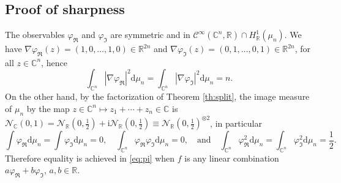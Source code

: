 \documentclass[11pt,reqno]{amsart}
\numberwithin{equation}{section}%
\numberwithin{figure}{section}%
\numberwithin{table}{section}
\theoremstyle{plain}
\theoremstyle{definition}
\begin{document}
\subsection{Proof of sharpness}
\label{ss:proof:sharp}

The observables $\varphi_\Re$ and $\varphi_\Im$ are symmetric and in
$\mathcal{C}^\infty(\mathbb{C}^n,\mathbb{R})\cap H^1_{\mathbb{R}}(\mu_n)$. We
have $\nabla\varphi_\Re(z)=(1,0,\ldots,1,0)\in\mathbb{R}^{2n}$ and
$\nabla\varphi_\Im(z)=(0,1,\ldots,0,1)\in\mathbb{R}^{2n}$, for all
$z\in\mathbb{C}^n$, hence
\begin{equation}
  \int_{\mathbb{C}^n}|\nabla\varphi_\Re|^2\mathrm{d}\mu_n
  =\int_{\mathbb{C}^n}|\nabla\varphi_\Im|^2\mathrm{d}\mu_n
  =n.
\end{equation}
On the other hand, by the factorization of Theorem \ref{th:split}, the image
measure of $\mu_n$ by the map
$z\in\mathbb{C}^n\mapsto z_1+\cdots+z_n\in\mathbb{C}$ is
$\mathcal{N}_{\mathbb{C}}(0,1)=\mathcal{N}_{\mathbb{R}}(0,\frac{1}{2})+\mathrm{i}\mathcal{N}_{\mathbb{R}}(0,\frac{1}{2})\equiv\mathcal{N}_{\mathbb{R}}(0,\frac{1}{2})^{\otimes
  2}$, in particular
\begin{equation}
  \int\varphi_\Re\mathrm{d}\mu_n
  =\int\varphi_\Im\mathrm{d}\mu_n=0,\quad
  \int_{\mathbb{C}^n}\varphi_\Re\varphi_\Im\mathrm{d}\mu_n
  =0,
  \quad\text{and}\quad 
  \int_{\mathbb{C}^n}\varphi_\Re^2\mathrm{d}\mu_n
  = \int_{\mathbb{C}^n}\varphi_\Im^2\mathrm{d}\mu_n
  =\frac{1}{2}.
\end{equation}
Therefore equality is achieved in \eqref{eq:pi} when $f$ is any linear
combination $a\varphi_\Re+b\varphi_\Im$, $a,b\in\mathbb{R}$.
\end{document}
